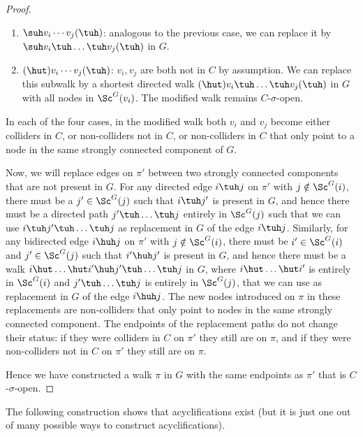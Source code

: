 \begin{proof}
\begin{enumerate}[label=(\roman*)]
\item
$\suh v_i \cdots v_j (\tuh)$: analogous to the previous case, we can replace it by $\suh v_i \tuh \dots \tuh v_j (\tuh)$ in $G$.

\item
$(\hut) v_i \cdots v_j (\tuh)$: 
$v_i,v_j$ are both not in $C$ by assumption. We can replace this subwalk by a shortest directed walk
$(\hut) v_i \tuh \dots \tuh v_j (\tuh)$ in $G$ with all nodes in $\Sc^G(v_i)$.
The modified walk remains $C$-$\sigma$-open.
\end{enumerate}
In each of the four cases, in the modified walk both $v_i$ and $v_j$ become
either colliders in $C$, or non-colliders not in $C$, or non-colliders in $C$
that only point to a node in the same strongly connected component of $G$.

Now, we will replace edges on $\pi'$ between two strongly connected components that are not present in $G$.
For any directed edge $i \tuh j$ on $\pi'$ with $j \notin \Sc^G(i)$, there
must be a $j' \in \Sc^G(j)$ such that $i \tuh j'$ is present in $G$, and hence there must be a directed path
$j' \tuh \dots \tuh j$ entirely in $\Sc^G(j)$ such that we can use
$i \tuh j' \tuh \dots \tuh j$ as replacement in $G$ of the edge $i \tuh j$.
Similarly, for any bidirected edge $i \huh j$ on $\pi'$ with $j \notin \Sc^G(i)$, there
must be $i' \in \Sc^G(i)$ and $j' \in \Sc^G(j)$ such that $i' \huh j'$ is present in $G$, 
and hence there must be a walk $i \hut \dots \hut i' \huh j' \tuh \dots \tuh j$ in $G$, where
$i \hut \dots \hut i'$ is entirely in $\Sc^G(i)$ and $j' \tuh \dots \tuh j$ is entirely
in $\Sc^G(j)$, that we can use as replacement in $G$ of the edge $i \huh j$.
The new nodes introduced on $\pi$ in these replacements are non-colliders
that only point to nodes in the same strongly connected component. 
The endpoints of the replacement paths do not change their status:
if they were colliders in $C$ on $\pi'$ they still are 
on $\pi$, and if they were non-colliders not in $C$ on $\pi'$ they still are on $\pi$.

Hence we have constructed a walk $\pi$ in $G$ with the same endpoints as $\pi'$ that is $C$-$\sigma$-open.
\end{proof}

The following construction shows that acyclifications exist (but it is just one out of many possible ways to construct acyclifications).

